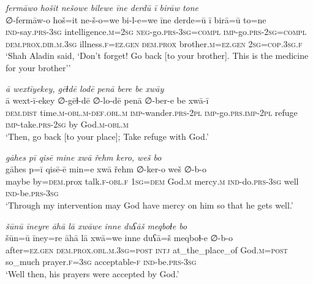 \ea \label{DG.56}
\textit{fermāwo hošit nešowe bilewe īne derdū ī birāw tone} \\ 
\gll ∅-fermāw-o hoš=it ne-š-o=we bi-l-e=we īne derde=ū ī birā=ū to=ne \\ 
 \textsc{ind-}say\textsc{.prs}\textsc{-3sg} intelligence\textsc{.m}\textsc{=\textsc{2sg}} \textsc{neg-}go\textsc{.prs}\textsc{-3sg}\textsc{=\textsc{compl}} \textsc{imp-}go\textsc{.prs}-\textsc{2sg}\textsc{=compl} \textsc{dem.prox}\textsc{.dir}\textsc{.m}\textsc{.3sg} illness\textsc{\textsc{.f}}\textsc{=ez}\textsc{.gen} \textsc{dem.prox} brother\textsc{.m}\textsc{=ez}\textsc{.gen} \textsc{2sg}\textsc{=cop}\textsc{.3sg}\textsc{\textsc{.f}} \\ 
\glt `Shah Aladin said, ‘Don’t forget! Go back [to your brother]. This is the medicine for your brother’'
\z 
 
\ea \label{DG.58}
\textit{ā wextīyekey, gēɫdē lodē penā bere be xwāy} \\ 
\gll ā wext-ī-ekey ∅-gēɫ-dē ∅-lo-dē penā ∅-ber-e be xwā-ī \\ 
 \textsc{dem.dist} time\textsc{.m}\textsc{-obl}\textsc{.m}\textsc{-def}\textsc{.obl}\textsc{.m} \textsc{imp-}wander\textsc{.prs}\textsc{-2pl} \textsc{imp-}go\textsc{.prs}\textsc{.imp}\textsc{-2pl} refuge \textsc{imp-}take\textsc{.prs}-\textsc{2sg} by God\textsc{.m}\textsc{-obl}\textsc{.m} \\ 
\glt `Then, go back [to your place]; Take refuge with God.'
\z 
 
\ea \label{DG.59}
\textit{gāhes pī qisē mine xwā řehm kero, weš bo} \\ 
\gll gāhes p=ī qisē-ē min=e xwā řehm ∅-ker-o weš ∅-b-o \\ 
 maybe by\textsc{=dem}.prox talk\textsc{\textsc{.f}}\textsc{-obl}\textsc{\textsc{.f}} \textsc{1sg}\textsc{=dem} God\textsc{.m} mercy\textsc{.m} \textsc{ind-}do\textsc{.prs}\textsc{-3sg} well \textsc{ind-}be\textsc{.prs}\textsc{-3sg} \\ 
\glt `Through my intervention may God have mercy on him so that he gets well.'
\z 
 
\ea \label{DG.60}
\textit{šūnū īneyre āhā lā xwāwe inne duʕāš meqboɫe bo} \\ 
\gll šūn=ū īney=re āhā lā xwā=we inne duʕā=š meqboɫ-e ∅-b-o \\ 
 after\textsc{=ez}\textsc{.gen} \textsc{dem.prox}\textsc{.obl}\textsc{.m}\textsc{.3sg}\textsc{=\textsc{post}} \textsc{intj} at\_the\_place\_of God\textsc{.m}\textsc{=\textsc{post}} so\_much prayer\textsc{\textsc{.f}}\textsc{=3sg} acceptable\textsc{-f} \textsc{ind-}be\textsc{.prs}\textsc{-3sg} \\ 
\glt `Well then, his prayers were accepted by God.'
\z 
 
